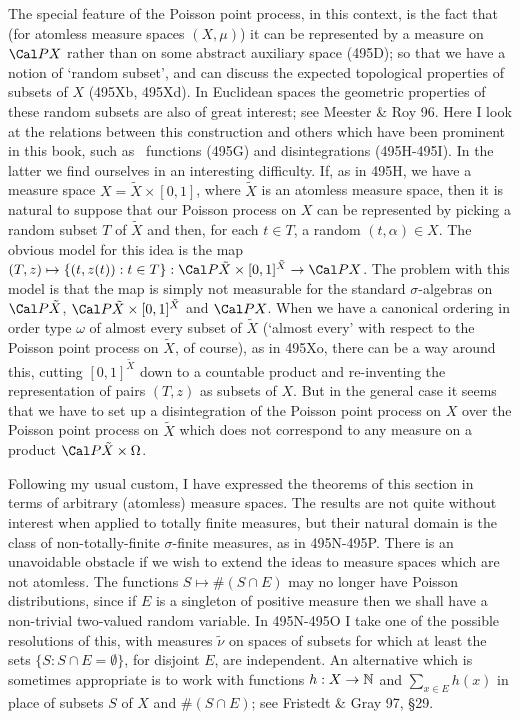 {The special feature of the Poisson point process, in this context, is
the fact that (for atomless measure spaces $(X,\mu)$) it can be
represented by a measure on $\Cal PX$ rather than on some abstract
auxiliary space (495D);  so that we have a notion of `random subset',
and can discuss the expected topological properties of subsets of $X$
(495Xb, 495Xd).   In Euclidean spaces the geometric properties of these
random subsets are also of great interest;  see
{\smc Meester \& Roy 96}.   Here I look at the relations between this construction and others
which have been prominent in this book, such as \imp\ functions (495G)
and disintegrations (495H-495I).   In the latter we find ourselves in an
interesting difficulty.   If, as in 495H, we have a measure space
$X=\tilde X\times[0,1]$, where $\tilde X$ is an atomless measure space,
then it is natural to suppose that our Poisson process on $X$ can be
represented by picking a random subset $T$ of $\tilde X$ and then, for
each $t\in T$, a random $(t,\alpha)\in X$.   The obvious model for this
idea is the map $(T,z)\mapsto\{(t,z(t)):t\in T\}:
\Cal P\tilde X\times[0,1]^{\tilde X}\to\Cal PX$.   The problem with this
model is that the map is simply not measurable for the standard
$\sigma$-algebras on $\Cal P\tilde X$,
$\Cal P\tilde X\times[0,1]^{\tilde X}$ and $\Cal PX$.   When we have a
canonical ordering in order type $\omega$ of almost every subset of
$\tilde X$ (`almost every' with respect to the Poisson point process on
$\tilde X$, of course), as in 495Xo, there can be a way around this,
cutting $[0,1]^{\tilde X}$ down to a countable product and re-inventing
the representation of pairs $(T,z)$ as subsets of $X$.   But in the
general case it seems that we have to set up a disintegration of the
Poisson point process on $X$ over the Poisson point process on
$\tilde X$ which does not correspond to any measure on a product
$\Cal P\tilde X\times\Omega$.

Following my usual custom, I have expressed the theorems of this section
in terms of arbitrary (atomless) measure spaces.   The results are not
quite without interest when applied to totally finite measures, but
their natural domain is the class of non-totally-finite $\sigma$-finite
measures, as in 495N-495P.   There is an unavoidable obstacle if we wish
to extend the ideas to measure spaces which are not atomless.   The
functions $S\mapsto\#(S\cap E)$ may no longer have Poisson
distributions, since if $E$ is a singleton of positive measure then we
shall have a non-trivial two-valued random variable.   In 495N-495O I
take one of the possible resolutions of this, with measures $\tilde\nu$
on spaces of subsets for which at least the sets
$\{S:S\cap E=\emptyset\}$, for disjoint $E$, are independent.   An
alternative which is sometimes appropriate is to work with functions
$h:X\to\Bbb N$ and $\sum_{x\in E}h(x)$ in place of subsets $S$ of $X$
and $\#(S\cap E)$;  see {\smc Fristedt \& Gray 97}, \S29.

}
